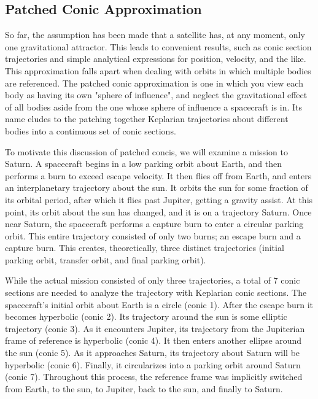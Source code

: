 \documentclass[../basicOrbitalDynamics.tex]{subfiles}
\begin{document}
\subsection{Patched Conic Approximation}\label{Patched Conics}

So far, the assumption has been made that a satellite has, at any moment, only one gravitational attractor. This leads to convenient results, such as conic section trajectories and simple analytical expressions for position, velocity, and the like. This approximation falls apart when dealing with orbits in which multiple bodies are referenced. The patched conic approximation is one in which you view each body as having its own "sphere of influence", and neglect the gravitational effect of all bodies aside from the one whose sphere of influence a spacecraft is in. Its name eludes to the patching together Keplarian trajectories about different bodies into a continuous set of conic sections.

To motivate this discussion of patched concis, we will examine a mission to Saturn. A spacecraft begins in a low parking orbit about Earth, and then performs a burn to exceed escape velocity. It then flies off from Earth, and enters an interplanetary trajectory about the sun. It orbits the sun for some fraction of its orbital period, after which it flies past Jupiter, getting a gravity assist. At this point, its orbit about the sun has changed, and it is on a trajectory Saturn. Once near Saturn, the spacecraft performs a capture burn to enter a circular parking orbit. This entire trajectory consisted of only two burns; an escape burn and a capture burn. This creates, theoretically, three distinct trajectories (initial parking orbit, transfer orbit, and final parking orbit).

While the actual mission consisted of only three trajectories, a total of 7 conic sections are needed to analyze the trajectory with Keplarian conic sections. The spacecraft's initial orbit about Earth is a circle (conic 1). After the escape burn it becomes hyperbolic (conic 2). Its trajectory around the sun is some elliptic trajectory (conic 3). As it encounters Jupiter, its trajectory from the Jupiterian frame of reference is hyperbolic (conic 4). It then enters another ellipse around the sun (conic 5). As it approaches Saturn, its trajectory about Saturn will be hyperbolic (conic 6). Finally, it circularizes into a parking orbit around Saturn (conic 7). Throughout this process, the reference frame was implicitly switched from Earth, to the sun, to Jupiter, back to the sun, and finally to Saturn.
\end{document}
